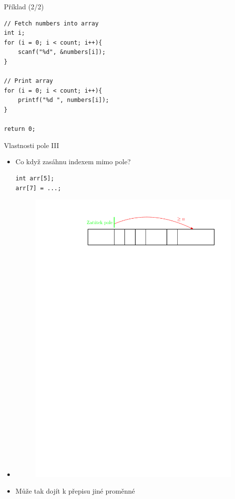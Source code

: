 \documentclass[14pt,aspectratio=169]{beamer}
\begin{document}
    \begin{frame}[t,fragile]{Příklad (2/2)}
        \begin{lstlisting}
// Fetch numbers into array
int i;
for (i = 0; i < count; i++){
    scanf("%d", &numbers[i]);
}

// Print array
for (i = 0; i < count; i++){
    printf("%d ", numbers[i]);
}

return 0;
        \end{lstlisting}
    \end{frame}

    \begin{frame}[t,fragile]{Vlastnosti pole III}
        \begin{itemize}
            \item Co když zasáhnu indexem mimo pole?
            \begin{lstlisting}
int arr[5];
arr[7] = ...;
            \end{lstlisting}
            \item {}
            \begin{figure}
                \includegraphics[scale=.8]{images/array_memory.pdf}
            \end{figure}
            \item Může tak dojít k přepisu jiné proměnné
        \end{itemize}
    \end{frame}
\end{document}
